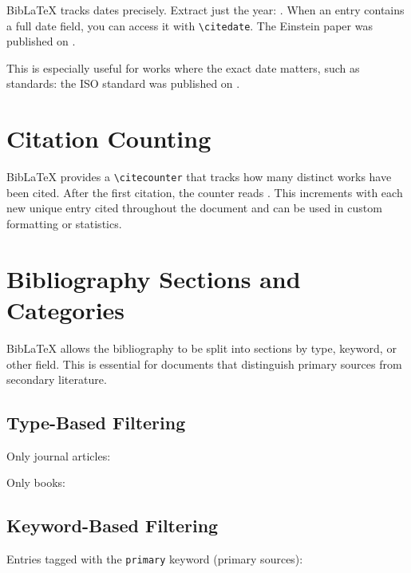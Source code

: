 \documentclass[
    language=english,
    doctype=article,
    institution=none,
]{../../omnilatex}
\begin{document}
BibLaTeX tracks dates precisely.  Extract just the year:
\citeyear{einstein1905}.  When an entry contains a full date field, you can
access it with \verb|\citedate|.  The Einstein paper was published on
.

This is especially useful for works where the exact date matters, such as
standards: the ISO standard was published on
.

\section{Citation Counting}
\label{sec:citation-counting}

BibLaTeX provides a \verb|\citecounter| that tracks how many distinct
works have been cited.  After the first citation, the counter reads
\citecounter.  This increments with each new unique entry cited throughout
the document and can be used in custom formatting or statistics.

\section{Bibliography Sections and Categories}
\label{sec:categories}

BibLaTeX allows the bibliography to be split into sections by type,
keyword, or other field.  This is essential for documents that
distinguish primary sources from secondary literature.

\subsection{Type-Based Filtering}

Only journal articles:
\printbibliography[type=article,heading=subbibliography,title={Journal Articles}]

Only books:
\printbibliography[type=book,heading=subbibliography,title={Books}]

\subsection{Keyword-Based Filtering}

Entries tagged with the \texttt{primary} keyword (primary sources):
\printbibliography[keyword=primary,heading=subbibliography,title={Primary Sources}]
\end{document}
